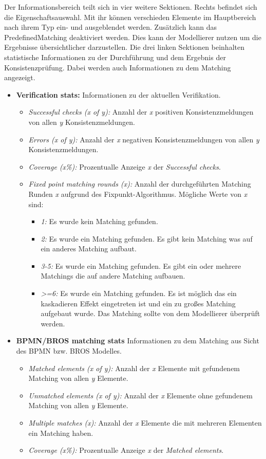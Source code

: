 Der Informationsbereich teilt sich in vier weitere Sektionen.
Rechts befindet sich die Eigenschaftsauswahl.
Mit ihr können verschieden Elemente im Hauptbereich nach ihrem Typ ein- und ausgeblendet werden.
Zusätzlich kann das PredefinedMatching deaktiviert werden.
Dies kann der Modellierer nutzen um die Ergebnisse übersichtlicher darzustellen.
Die drei linken Sektionen beinhalten statistische Informationen zu der Durchführung und dem Ergebnis der Konsistenzprüfung.
Dabei werden auch Informationen zu dem Matching angezeigt.

\begin{itemize}
    \item \textbf{Verification stats:} Informationen zu der aktuellen Verifikation.
    \begin{itemize}
        \item \emph{Successful checks (x of y):} Anzahl der \emph{x} positiven Konsistenzmeldungen von allen \emph{y} Konsistenzmeldungen. 
        \item \emph{Errors (x of y):} Anzahl der \emph{x} negativen Konsistenzmeldungen von allen \emph{y} Konsistenzmeldungen.
        \item \emph{Coverage (x\%):} Prozentualle Anzeige \emph{x} der \emph{Successful checks}.
        \item \emph{Fixed point matching rounds (x):} Anzahl der durchgeführten Matching Runden \emph{x} aufgrund des Fixpunkt-Algorithmus. Mögliche Werte von \emph{x} sind:
        \begin{itemize}
            \item \emph{1:} Es wurde kein Matching gefunden.
            \item \emph{2:} Es wurde ein Matching gefunden. Es gibt kein Matching was auf ein anderes Matching aufbaut.
            \item \emph{3-5:} Es wurde ein Matching gefunden. Es gibt ein oder mehrere Matchings die auf andere Matching aufbauen.
            \item \emph{>=6:} Es wurde ein Matching gefunden. Es ist möglich das ein kaskadieren Effekt eingetreten ist und ein zu großes Matching aufgebaut wurde. Das Matching sollte von dem Modellierer überprüft werden.
        \end{itemize}
    \end{itemize}
    \item \textbf{BPMN/BROS matching stats} Informationen zu dem Matching aus Sicht des BPMN bzw. BROS Modelles.
    \begin{itemize}
        \item \emph{Matched elements (x of y):} Anzahl der \emph{x} Elemente mit gefundenem Matching von allen \emph{y} Elemente.
        \item \emph{Unmatched elements (x of y):} Anzahl der \emph{x} Elemente ohne gefundenem Matching von allen \emph{y} Elemente.
        \item \emph{Multiple matches (x):} Anzahl der \emph{x} Elemente die mit mehreren Elementen ein Matching haben. 
        \item \emph{Coverage (x\%):} Prozentualle Anzeige \emph{x} der \emph{Matched elements}.
    \end{itemize}
\end{itemize}


